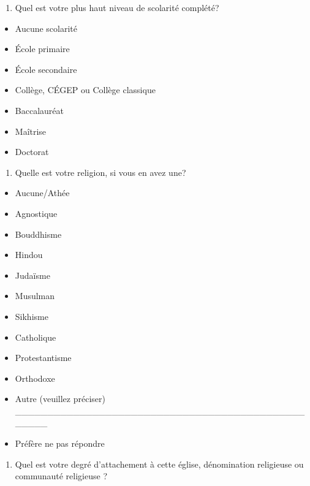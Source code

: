 \documentclass[
  letterpaper,
  DIV=11,
  numbers=noendperiod]{scrreprt}
\providecommand{\tightlist}{%
  \setlength{\itemsep}{0pt}\setlength{\parskip}{0pt}}\usepackage{longtable,booktabs,array}
\begin{document}
\begin{enumerate}
\def\labelenumi{\arabic{enumi}.}
\setcounter{enumi}{6}
\tightlist
\item
  Quel est votre plus haut niveau de scolarité complété?
\end{enumerate}

\begin{itemize}
\tightlist
\item
  Aucune scolarité
\item
  École primaire
\item
  École secondaire
\item
  Collège, CÉGEP ou Collège classique
\item
  Baccalauréat
\item
  Maîtrise
\item
  Doctorat
\end{itemize}

\begin{enumerate}
\def\labelenumi{\arabic{enumi}.}
\setcounter{enumi}{7}
\tightlist
\item
  Quelle est votre religion, si vous en avez une?
\end{enumerate}

\begin{itemize}
\tightlist
\item
  Aucune/Athée
\item
  Agnostique
\item
  Bouddhisme
\item
  Hindou
\item
  Judaïsme
\item
  Musulman
\item
  Sikhisme
\item
  Catholique
\item
  Protestantisme
\item
  Orthodoxe
\item
  Autre (veuillez préciser)
  \_\_\_\_\_\_\_\_\_\_\_\_\_\_\_\_\_\_\_\_\_\_\_\_\_\_\_\_\_\_\_\_\_\_\_\_\_\_\_\_\_\_\_\_\_\_\_\_\_\_
\item
  Préfère ne pas répondre
\end{itemize}

\begin{enumerate}
\def\labelenumi{\arabic{enumi}.}
\setcounter{enumi}{8}
\tightlist
\item
  Quel est votre degré d'attachement à cette église, dénomination
  religieuse ou communauté religieuse ?
\end{enumerate}
\end{document}
